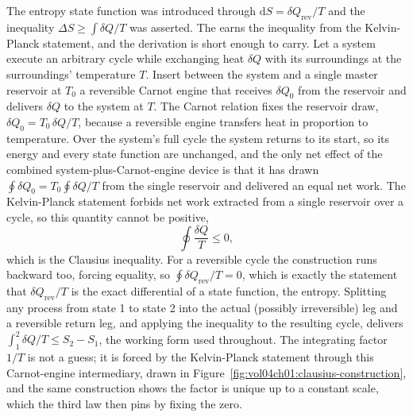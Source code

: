 \begin{mastery}
The entropy state function was introduced through $\mathrm{d}S = \delta
Q_{\text{rev}}/T$ and the inequality $\Delta S \geq \int \delta Q/T$ was
asserted. The  earns the inequality from the
Kelvin-Planck statement, and the derivation is short enough to carry. Let a
system execute an arbitrary cycle while exchanging heat $\delta Q$ with its
surroundings at the surroundings' temperature $T$. Insert between the system
and a single master reservoir at $T_0$ a reversible Carnot engine that
receives $\delta Q_0$ from the reservoir and delivers $\delta Q$ to the
system at $T$. The Carnot relation fixes the reservoir draw,
$\delta Q_0 = T_0\,\delta Q/T$, because a reversible engine transfers heat in
proportion to temperature. Over the system's full cycle the system returns to
its start, so its energy and every state function are unchanged, and the only
net effect of the combined system-plus-Carnot-engine device is that it has
drawn $\oint \delta Q_0 = T_0 \oint \delta Q/T$ from the single reservoir and
delivered an equal net work. The Kelvin-Planck statement forbids net work
extracted from a single reservoir over a cycle, so this quantity cannot be
positive,
\[
\oint \frac{\delta Q}{T} \leq 0,
\]
which is the Clausius inequality. For a reversible cycle the construction runs
backward too, forcing equality, so $\oint \delta Q_{\text{rev}}/T = 0$, which
is exactly the statement that $\delta Q_{\text{rev}}/T$ is the exact
differential of a state function, the entropy. Splitting any process from
state 1 to state 2 into the actual (possibly irreversible) leg and a
reversible return leg, and applying the inequality to the resulting cycle,
delivers $\int_1^2 \delta Q/T \leq S_2 - S_1$, the working form used
throughout. The integrating factor $1/T$ is not a guess; it is forced by the
Kelvin-Planck statement through this Carnot-engine intermediary, drawn in
Figure~\ref{fig:vol04ch01:clausius-construction}, and the same construction shows
the factor is unique up to a constant scale, which the third law then pins by
fixing the zero.
\end{mastery}



